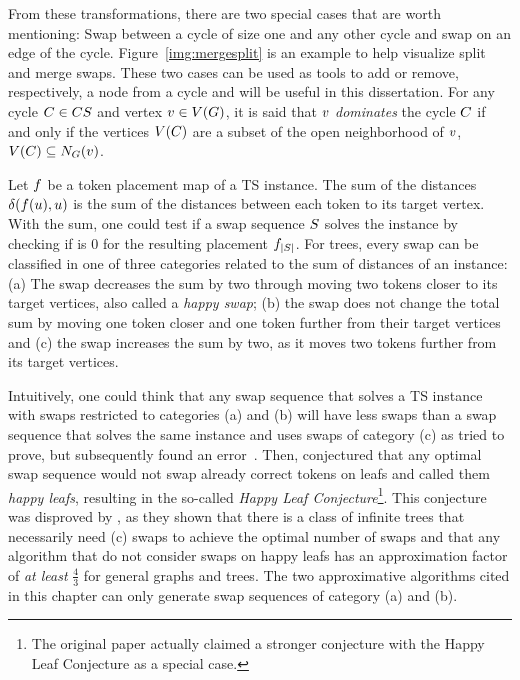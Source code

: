 \documentclass[msc]{ppgccufmg}    %
\begin{document}
From these transformations, there are two special cases that are worth 
mentioning: Swap between a cycle of size one and any other cycle and swap on an 
edge of the cycle.
Figure~\ref{img:mergesplit} is an example to help visualize split and merge swaps.
These two cases can be used as tools to add or remove, respectively, a node from 
a cycle and will be useful in this dissertation.
For any cycle $C \in CS$ and vertex $v \in V(G)$,
it is said that $v$ \textit{dominates} the cycle $C$ if and only if
the vertices $V(C)$ are a subset of the open neighborhood of 
$v$, $V(C) \subseteq N_{G}(v)$.



Let $f$ be a token placement map of a TS instance.
The sum of the distances $\delta(f(u), u)$
is the sum of the distances between each token to its target vertex. 
With the sum, one could test if a swap sequence $S$ solves the instance
by checking if is 0 for the resulting placement $f_{|S|}$.
For trees, every swap can be classified in one of three categories related to 
the sum of distances of an instance: (a) The swap decreases the sum by two 
through moving two tokens closer to its target vertices, also called a 
\textit{happy swap}; (b) the swap does not change the total sum by moving one 
token closer and one token further from their target vertices and (c) the swap 
increases the sum by two, as it moves two tokens further from its target 
vertices.

Intuitively, one could think that any swap sequence that solves a TS instance 
with swaps restricted to categories (a) and (b) will have less swaps than a 
swap sequence that solves the same instance and uses swaps of category (c) 
\textemdash as \citep{Smith:1999} tried to prove, but subsequently found an 
error~\citep{Smith:2011:Corrigendum}.
Then, \citep{Vaughan:1991} conjectured that any optimal swap sequence would 
not swap already correct tokens on leafs and called them \textit{happy leafs}, 
resulting in the so-called \textit{Happy Leaf Conjecture}\footnote{The original 
paper actually claimed a stronger conjecture with the Happy Leaf Conjecture as 
a special case.}.
This conjecture was disproved by \citep{Ahmad:2019}, as they shown that there is 
a class of infinite trees that necessarily need (c) swaps to achieve the optimal 
number of swaps and that any algorithm that do not consider swaps on 
happy leafs has an approximation factor of \textit{at least} $\frac{4}{3}$ for 
general graphs and trees.
The two approximative algorithms cited in this chapter can only generate swap 
sequences of category (a) and (b).
\end{document}

